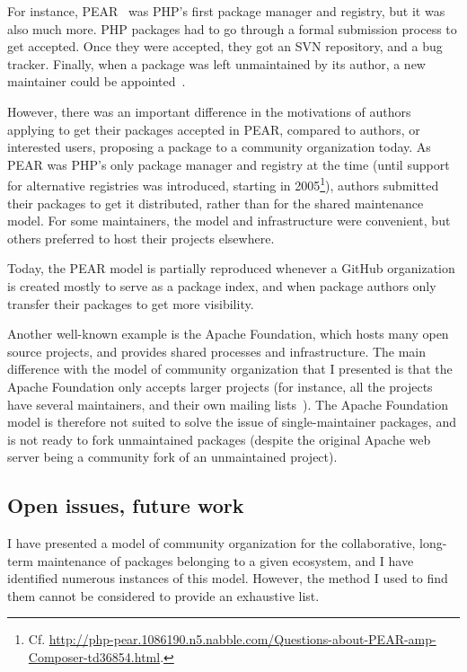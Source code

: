 For instance, PEAR~\cite{pear} was PHP's first package manager and registry, but it was also much more.
PHP packages had to go through a formal submission process to get accepted.
Once they were accepted, they got an SVN repository, and a bug tracker.
Finally, when a package was left unmaintained by its author, a new maintainer could be appointed~\cite{pear_orphaned}.

However, there was an important difference in the motivations of authors applying to get their packages accepted in PEAR, compared to authors, or interested users, proposing a package to a community organization today.
As PEAR was PHP's only package manager and registry at the time (until support for alternative registries was introduced, starting in 2005\footnote{
	Cf. \url{http://php-pear.1086190.n5.nabble.com/Questions-about-PEAR-amp-Composer-td36854.html}.
}), authors submitted their packages to get it distributed, rather than for the shared maintenance model.
For some maintainers, the model and infrastructure were convenient, but others preferred to host their projects elsewhere.

Today, the PEAR model is partially reproduced whenever a GitHub organization is created mostly to serve as a package index, and when package authors only transfer their packages to get more visibility.

Another well-known example is the Apache Foundation, which hosts many open source projects, and provides shared processes and infrastructure.
The main difference with the model of community organization that I presented is that the Apache Foundation only accepts larger projects (for instance, all the projects have several maintainers, and their own mailing lists~\cite{apache_how_it_works}).
The Apache Foundation model is therefore not suited to solve the issue of single-maintainer packages, and is not ready to fork unmaintained packages (despite the original Apache web server being a community fork of an unmaintained project).

\subsection{Open issues, future work}

\label{sec:open-issues-community-org}

I have presented a model of community organization for the collaborative, long-term maintenance of packages belonging to a given ecosystem, and I have identified numerous instances of this model.
However, the method I used to find them cannot be considered to provide an exhaustive list.

